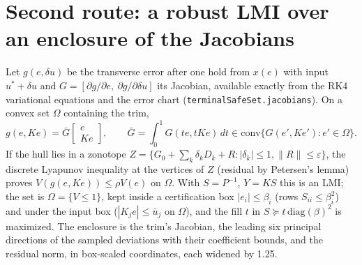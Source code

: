 \documentclass[11pt]{article}
\begin{document}
\section{Second route: a robust LMI over an enclosure of the Jacobians}
Let $g(e,\delta u)$ be the transverse error after one hold from $x(e)$ with
input $u^*+\delta u$ and $G=[\partial g/\partial e,\ \partial g/\partial\delta u]$
its Jacobian, available exactly from the RK4 variational equations and the
error chart (\texttt{terminalSafeSet.jacobians}). On a convex set $\Omega$
containing the trim,
\[
g(e,Ke)=\bar G\begin{bmatrix}e\\Ke\end{bmatrix},\qquad
\bar G=\int_0^1 G(te,tKe)\,dt\in\mathrm{conv}\{G(e',Ke'):e'\in\Omega\}.
\]
If the hull lies in a zonotope $Z=\{G_0+\sum_k\delta_kD_k+R:|\delta_k|\le1,\|R\|\le\varepsilon\}$,
the discrete Lyapunov inequality at the vertices of $Z$ (residual by
Petersen's lemma) proves $V(g(e,Ke))\le\rho V(e)$ on $\Omega$. With
$S=P^{-1}$, $Y=KS$ this is an LMI; the set is $\Omega=\{V\le1\}$, kept inside
a certification box $|e_i|\le\beta_i$ (rows $S_{ii}\le\beta_i^2$) and under
the input box ($|K_je|\le\bar u_j$ on $\Omega$), and the fill
$t$ in $S\succeq t\,\mathrm{diag}(\beta)^2$ is maximized. The enclosure is
the trim's Jacobian, the leading six principal directions of the sampled
deviations with their coefficient bounds, and the residual norm, in
box-scaled coordinates, each widened by 1.25.
\end{document}
